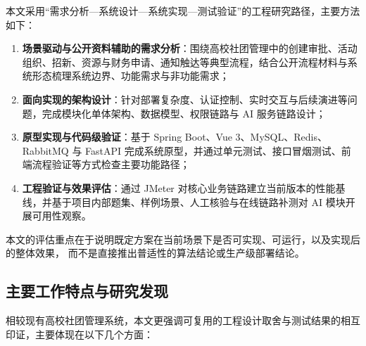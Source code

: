 本文采用“需求分析—系统设计—系统实现—测试验证”的工程研究路径，主要方法如下：

\begin{enumerate}
  \item \textbf{场景驱动与公开资料辅助的需求分析}：围绕高校社团管理中的创建审批、活动组织、招新、资源与财务申请、通知触达等典型流程，结合公开流程材料与系统形态梳理系统边界、功能需求与非功能需求；
  \item \textbf{面向实现的架构设计}：针对部署复杂度、认证控制、实时交互与后续演进等问题，完成模块化单体架构、数据模型、权限链路与 AI 服务链路设计；
  \item \textbf{原型实现与代码级验证}：基于 Spring Boot、Vue 3、MySQL、Redis、RabbitMQ 与 FastAPI 完成系统原型，并通过单元测试、接口冒烟测试、前端流程验证等方式检查主要功能路径；
  \item \textbf{工程验证与效果评估}：通过 JMeter 对核心业务链路建立当前版本的性能基线，并基于项目内部题集、样例场景、人工核验与在线链路补测对 AI 模块开展可用性观察。
\end{enumerate}

本文的评估重点在于说明既定方案在当前场景下是否可实现、可运行，以及实现后的整体效果，
而不是直接推出普适性的算法结论或生产级部署结论。

\subsection{主要工作特点与研究发现}

相较现有高校社团管理系统，本文更强调可复用的工程设计取舍与测试结果的相互印证，主要体现在以下几个方面：

